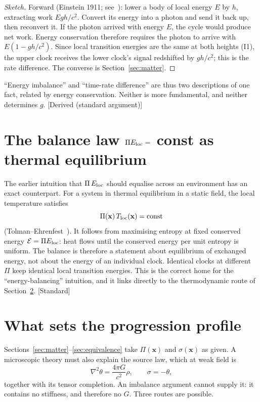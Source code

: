\documentclass[11pt]{article}
\newcommand{\Pg}{\Pi}
\newcommand{\thP}{\theta}
\newcommand{\sgP}{\sigma}
\newcommand{\Eloc}{E_{\rm loc}}
\newcommand{\Eref}{\mathcal{E}}
\newcommand{\st}[1]{\textsf{\small[#1]}}
\theoremstyle{plain}
\theoremstyle{remark}
\begin{document}
\begin{proof}[Sketch]
Forward (Einstein 1911; see~\cite{Okun2000}): lower a body of local energy $E$ by $h$, extracting work $Egh/c^2$. Convert its energy into a photon and send it back up, then reconvert it. If the photon arrived with energy $E$, the cycle would produce net work. Energy conservation therefore requires the photon to arrive with $E(1-gh/c^2)$. Since local transition energies are the same at both heights (I1), the upper clock receives the lower clock's signal redshifted by $gh/c^2$; this is the rate difference. The converse is Section~\ref{sec:matter}.
\end{proof}

``Energy imbalance'' and ``time-rate difference'' are thus two descriptions of one fact, related by energy conservation. Neither is more fundamental, and neither determines $g$. \st{Derived (standard argument)}

\section{The balance law \texorpdfstring{$\Pg E_{\rm loc}=$}{Pi E = } const as thermal equilibrium}

The earlier intuition that $\Pg\,\Eloc$ should equalise across an environment has an exact counterpart. For a system in thermal equilibrium in a static field, the local temperature satisfies
\begin{equation}
\Pg(\mathbf x)\,T_{\rm loc}(\mathbf x)=\text{const}
\end{equation}
(Tolman--Ehrenfest~\cite{Tolman1930}). It follows from maximising entropy at fixed conserved energy $\Eref=\Pg\Eloc$: heat flows until the conserved energy per unit entropy is uniform. The balance is therefore a statement about equilibrium of exchanged energy, not about the energy of an individual clock. Identical clocks at different $\Pg$ keep identical local transition energies. This is the correct home for the ``energy-balancing'' intuition, and it links directly to the thermodynamic route of Section~\ref{sec:source}. \st{Standard}

\section{What sets the progression profile}
\label{sec:source}

Sections~\ref{sec:matter}--\ref{sec:equivalence} take $\Pg(\mathbf x)$ and $\sgP(\mathbf x)$ as given. A microscopic theory must also explain the source law, which at weak field is
\begin{equation}
\nabla^2\thP=\frac{4\pi G}{c^2}\rho,\qquad \sgP=-\thP,
\label{eq:source}
\end{equation}
together with its tensor completion. An imbalance argument cannot supply it: it contains no stiffness, and therefore no $G$. Three routes are possible.
\end{document}

